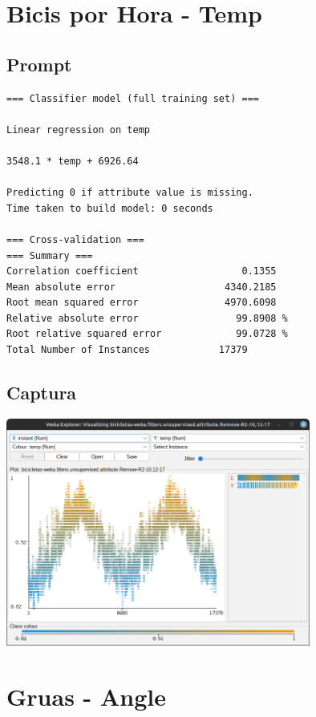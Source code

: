 \documentclass[12pt]{article}
\begin{document}
\section*{Bicis por Hora - Temp}
\label{sec:org86b8e99}
\subsection*{Prompt}
\label{sec:orgaa072cd}
\begin{verbatim}
=== Classifier model (full training set) ===

Linear regression on temp

3548.1 * temp + 6926.64

Predicting 0 if attribute value is missing.
Time taken to build model: 0 seconds

=== Cross-validation ===
=== Summary ===
Correlation coefficient                  0.1355
Mean absolute error                   4340.2185
Root mean squared error               4970.6098
Relative absolute error                 99.8908 %
Root relative squared error             99.0728 %
Total Number of Instances            17379     
\end{verbatim}

\subsection*{Captura}
\label{sec:orgd4cb78d}
\begin{center}
\includegraphics[width=10cm]{img/2.png}
\end{center}

\section*{Gruas - Angle}
\label{sec:org05a0705}
\end{document}
